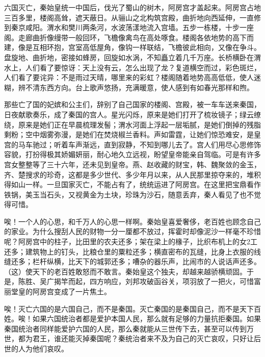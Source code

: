 \documentclass[12pt,UTF-8,openany]{ctexbook}
\begin{document}
\begin{normalsize}
    
    六国灭亡，秦始皇统一中国后，伐光了蜀山的树木，阿房宫才盖起来。阿房宫占地三百多里，楼阁高耸，遮天蔽日。从骊山之北构筑宫殿，曲折地向西延伸，一直修到秦京咸阳。渭水和樊川两条河，水波荡漾地流入宫墙。五步一栋楼，十步一座阁。走廊曲折像缦带一般回环，飞檐像禽鸟在高处啄食。楼阁各依地势的高下而建，像是互相环抱，宫室高低屋角，像钩一样联结，飞檐彼此相向，又像在争斗。盘旋地、曲折地，密接如蜂房，回旋如水涡，不知矗立着几千万座。长桥横卧在渭水上，人们看了要惊讶：天上没有云，怎么出现了龙？复道横空而过，彩色斑烂，人们看了要诧异：不是雨过天晴，哪里来的彩虹？楼阁随着地势高高低低，使人迷糊，辨不清东西方向。台上歌声悠扬，充满暖意，使人感到有如春光那样和煦。
    
    那些亡了国的妃嫔和公主们，辞别了自己国家的楼阁、宫殿，被一车车送来秦国，日夜献歌奏乐，成了秦国的宫人。星光闪烁，原来是她们打开了梳妆镜子；绿云缭绕，原来是她们正在早晨梳理发髻；渭水河面上浮起一层垢腻，是她们倒掉的残脂剩粉；空中烟雾弥漫，是她们在焚烧椒兰香料。声如雷霆，让她们惊恐难安，是皇宫的马车驰过；听着车声渐远，直到寂静，不知到哪儿去了。宫人们用尽心思修饰容貌，打扮得极其娇媚妍丽，耐心地久立远视，盼望皇帝能亲自驾临。可是有许多宫女整整等了三十六年，还未见到皇帝。燕、赵收藏的财宝，韩、魏聚敛的金玉，齐、楚搜求的珍奇，这都是多少世代、多少年月以来，从人民那里掠夺来的，堆积得如山一样。一旦国家灭亡，不能占有了，统统运进了阿房宫。在这里把宝鼎看作铁锅，美玉当石头，又视黄金为土块，珍珠为沙石，随意丢弃，秦人看见了也不觉得可惜。
    
    唉！一个人的心思，和千万人的心思一样啊。秦始皇喜爱奢侈，老百姓也顾念自己的家业。为什么搜刮人民的财物一分一厘都不放过，挥霍时却像泥沙一样毫不珍惜呢？阿房宫中的柱子，比田里的农夫还多；架在梁上的椽子，比织布机上的女2工还多；建筑物上的钉头，比粮仓里的粟粒还多；横直密布的瓦缝，比身上衣服的线缝还多；栏杆纵横，比天下的城郭还多；嘈杂的器乐声，比闹市的人说话声还多。（这）使天下的老百姓敢怒而不敢言。秦始皇这个独夫，却越来越骄横顽固。于是，陈胜、吴广揭竿而起，四方响应，刘邦攻破函谷关，项羽放了一把火，可惜富丽堂皇的阿房宫变成了一片焦土。
    
    唉！灭亡六国的是六国自己，而不是秦国。灭亡秦国的是秦国自己，而不是天下百姓。唉！如果六国统治者都是爱护本国人民，那么就有足够的力量抗拒秦国。如果秦国统治者同样能爱护六国的人民，那么秦就能从三世传下去，甚至可以传到万世，都为君王，谁还能灭掉秦国呢？秦统治者来不及为自己的灭亡哀叹，只好让后世的人为他们哀叹。
    
\end{normalsize}
\end{document}
